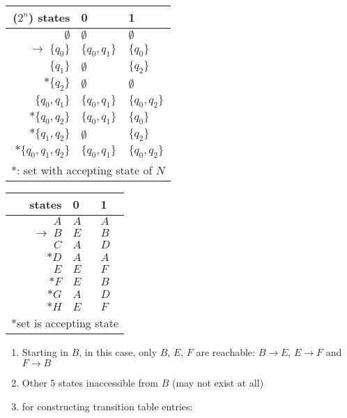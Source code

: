 \documentclass[10pt,a4paper,landscape]{article}
\begin{document}
\begin{multicols*}{3}
\begin{minipage}{.6\linewidth}
  \centering
  \begin{tabular}{r||l|l}
    ($2^{n}$) states & 0 & 1 \\
    \hline
    \hline
    $\emptyset$ & $\emptyset$ & $\emptyset$ \\
    $\to\; \{q_{0}\}$    & $\{q_{0},q_{1}\}$ & $\{q_{0}\}$\\
    $\{q_{1}\}$          & $\emptyset$      & $\{q_{2}\}$\\
    $*\{q_{2}\}$         & $\emptyset$      & $\emptyset$\\
    $\{q_{0},q_{1}\}$ & $\{q_{0},q_{1}\}$ & $\{q_{0},q_{2}\}$\\
    $*\{q_{0},q_{2}\}$ & $\{q_{0},q_{1}\}$ & $\{q_{0}\}$\\
    $*\{q_{1},q_{2}\}$ & $\emptyset$ & $\{q_{2}\}$\\
    $*\{q_{0},q_{1},q_{2}\}$ & $\{q_{0},q_{1}\}$ & $\{q_{0},q_{2}\}$\\
    \hline
    \hline
    \multicolumn{3}{l}{*: set with accepting state of $N$}
  \end{tabular}
\end{minipage}
\begin{minipage}{.4\linewidth}
  \begin{tabular}{r||l|l}
    states & 0 & 1 \\
    \hline
    \hline
    $A$ & $A$ & $A$ \\
    $\to\;B$  & $E$ & $B$\\
    $C$       & $A$ & $D$\\
    $*D$      & $A$ & $A$\\
    $E$       & $E$ & $F$\\
    $*F$      & $E$ & $B$\\
    $*G$      & $A$ & $D$\\
    $*H$    & $E$ & $F$\\
    \hline
    \hline
    \multicolumn{3}{l}{*set is accepting state}
  \end{tabular}
\end{minipage}
\begin{enumerate}
\item Starting in $B$, in this case, only $B$, $E$, $F$ are reachable: $B\to E$, $E\to F$ and $F\to B$
\item Other 5 states inaccessible from $B$ (may not exist at all)
\item {} for constructing transition table entries:
  \begin{enumerate}[label={\alph*.}]

\end{enumerate}
\end{enumerate}
\end{multicols*}
\end{document}
